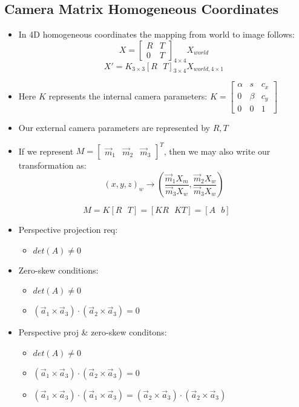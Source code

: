 \subsection{Camera Matrix Homogeneous Coordinates}
\begin{itemize}
	\item In 4D homogeneous coordinates the mapping from world to image follows:
	$$X=\begin{bmatrix}
		R & T \\
		0 & T
	\end{bmatrix}_{4\times 4} X_{world}$$
	$$X'=K_{3\times 3}[R\text{ }T]_{3\times 4} X_{world, 4\times 1}$$
	\item Here $K$ represents the internal camera parameters: $K=\begin{bmatrix}
		\alpha & s & c_x \\
		0 & \beta & c_y \\
		0 & 0 & 1
	\end{bmatrix}$
	\item Our external camera parameters are represented by $R, T$
	\item If we represent $M=\begin{bmatrix}
		\vec{m}_1 & \vec{m}_2 & \vec{m}_3
	\end{bmatrix}^{T}$, then we may also write our transformation as:
	$$(x,y,z)_w\to (\frac{\vec{m}_1 X_m}{\vec{m}_3 X_w}, \frac{\vec{m}_2 X_w}{\vec{m}_3 X_w} )$$
\end{itemize}

\begin{theorem}
	$$M=K[R\text{ }T]=[KR\text{ }KT]=[A\text{ }b]$$
\begin{itemize}
	\item Perspective projection req:
	\begin{itemize}
		\item $det(A)\neq 0$
	\end{itemize}
	\item Zero-skew conditions:
	\begin{itemize}
		\item $det(A)\neq 0$
		\item $(\vec{a}_1\times \vec{a}_3)\cdot(\vec{a}_2\times \vec{a}_3)=0$
	\end{itemize}
	\item Perspective proj \& zero-skew conditons:
	\begin{itemize}
		\item $det(A)\neq 0$
		\item $(\vec{a}_1\times \vec{a}_3)\cdot(\vec{a}_2\times \vec{a}_3)=0$
		\item $(\vec{a}_1\times \vec{a}_3)\cdot(\vec{a}_1\times \vec{a}_3)=(\vec{a}_2\times \vec{a}_3)\cdot(\vec{a}_2\times \vec{a}_3)$
	\end{itemize}
\end{itemize}
\end{theorem}


